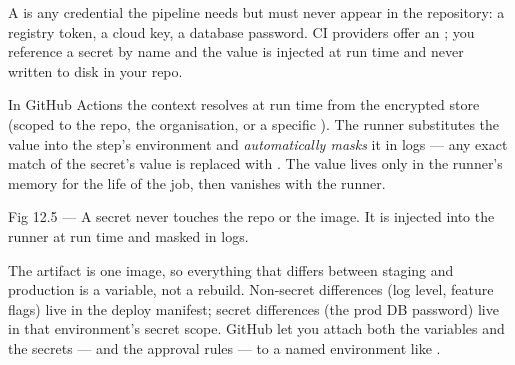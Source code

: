 
 A  is any credential the pipeline needs but must never appear in the repository: a registry token, a cloud key, a database password. CI providers offer an ; you reference a secret by name and the value is injected at run time and never written to disk in your repo.

 In GitHub Actions the  context resolves  at run time from the encrypted store (scoped to the repo, the organisation, or a specific ). The runner substitutes the value into the step's environment and \emph{automatically masks} it in logs --- any exact match of the secret's value is replaced with \code{***}. The value lives only in the runner's memory for the life of the job, then vanishes with the runner.

\begin{wbfigure}{Fig 12.5 --- A secret never touches the repo or the image. It is injected into the runner at run time and masked in logs.}
\end{wbfigure}

 The artifact is one image, so everything that differs between staging and production is a variable, not a rebuild. Non-secret differences (log level, feature flags) live in the deploy manifest; secret differences (the prod DB password) live in that environment's secret scope. GitHub  let you attach both the variables and the secrets --- and the approval rules --- to a named environment like .

